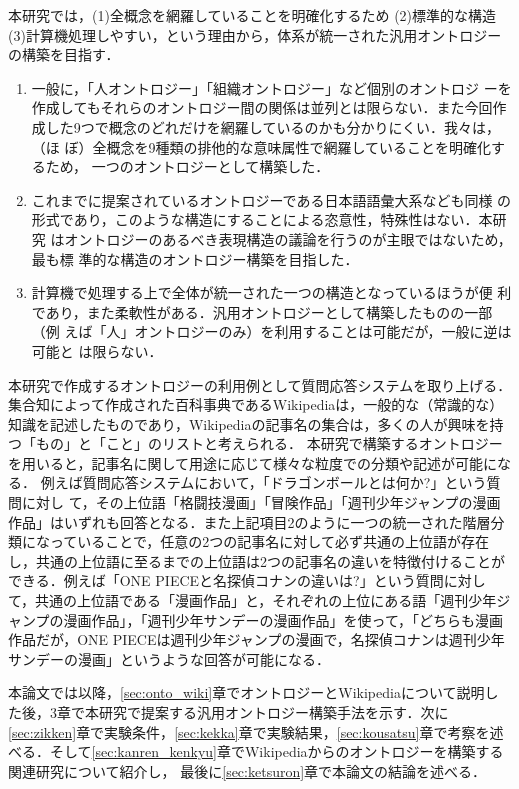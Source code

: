\documentclass[japanese]{jnlp_1.4}
\begin{document}
本研究では，(1)全概念を網羅していることを明確化するため (2)標準的な構造 
(3)計算機処理しやすい，という理由から，体系が統一された汎用オントロジー
の構築を目指す．

\begin{enumerate}
\item
一般に，「人オントロジー」「組織オントロジー」など個別のオントロジ
ーを作成してもそれらのオントロジー間の関係は並列とは限らない．また今回作
成した9つで概念のどれだけを網羅しているのかも分かりにくい．我々は，（ほ
ぼ）全概念を9種類の排他的な意味属性で網羅していることを明確化するため，
一つのオントロジーとして構築した．
\item
これまでに提案されているオントロジーである日本語語彙大系なども同様
の形式であり，このような構造にすることによる恣意性，特殊性はない．本研究
はオントロジーのあるべき表現構造の議論を行うのが主眼ではないため，最も標
準的な構造のオントロジー構築を目指した．
\item
計算機で処理する上で全体が統一された一つの構造となっているほうが便
利であり，また柔軟性がある．汎用オントロジーとして構築したものの一部（例
えば「人」オントロジーのみ）を利用することは可能だが，一般に逆は可能と
は限らない．
\end{enumerate}

本研究で作成するオントロジーの利用例として質問応答システムを取り上げる．
集合知によって作成された百科事典であるWikipediaは，一般的な（常識的な）知識を記述したものであり，Wikipediaの記事名の集合は，多くの人が興味を持つ「もの」と「こと」のリストと考えられる．
本研究で構築するオントロジーを用いると，記事名に関して用途に応じて様々な粒度での分類や記述が可能になる．
例えば質問応答システムにおいて，「ドラゴンボールとは何か?」という質問に対し
て，その上位語「格闘技漫画」「冒険作品」「週刊少年ジャンプの漫画作品」はいずれも回答となる．また上記項目2のように一つの統一された階層分類になっていることで，任意の2つの記事名に対して必ず共通の上位語が存在し，共通の上位語に至るまでの上位語は2つの記事名の違いを特徴付けることができる．例えば「ONE PIECEと名探偵コナンの違いは?」という質問に対して，共通の上位語である「漫画作品」と，それぞれの上位にある語「週刊少年ジャンプの漫画作品」，「週刊少年サンデーの漫画作品」を使って，「どちらも漫画作品だが，ONE PIECEは週刊少年ジャンプの漫画で，名探偵コナンは週刊少年サンデーの漫画」というような回答が可能になる．

本論文では以降，\ref{sec:onto_wiki}章でオントロジーとWikipediaについて説明した後，3章で本研究で提案する汎用オントロジー構築手法を示す．次に\ref{sec:zikken}章で実験条件，\ref{sec:kekka}章で実験結果，\ref{sec:kousatsu}章で考察を述べる．そして\ref{sec:kanren_kenkyu}章でWikipediaからのオントロジーを構築する関連研究について紹介し，
最後に\ref{sec:ketsuron}章で本論文の結論を述べる．
\end{document}
